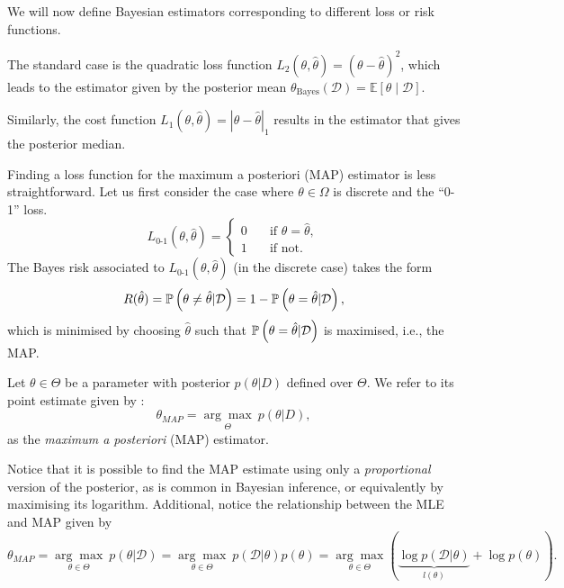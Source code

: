 We will now define Bayesian estimators corresponding to different loss or risk functions.

\begin{definition}
The standard case is the quadratic loss function $L_2(\theta,\hat{\theta}) = (\theta-\hat{\theta})^2$, which leads to the estimator given by the posterior mean $\theta_{\mathrm{Bayes}}(\mathcal{D}) = \mathbb{E}[\theta \mid \mathcal{D}]$.
\end{definition}


\begin{definition}
Similarly, the cost function $L_1(\theta,\hat\theta) = |\theta-\hat\theta|_1$ results in the estimator that gives the posterior median.
\end{definition}

Finding a loss function for the maximum a posteriori (MAP) estimator is less straightforward. Let us first consider the case where $\theta \in \Omega$ is discrete and the ``0-1'' loss.
\[   
L_\text{0-1}(\theta,\hat\theta) = 
     \begin{cases}
       0 &\quad\text{if } \theta = \hat\theta,\\
       1 &\quad\text{if not}. 
     \end{cases}
\]
The Bayes risk associated to $L_\text{0-1}(\theta,\hat\theta)$ (in the discrete case) takes the form
\begin{equation}
    R(\hat\theta) = \mathbb{P} \left(\theta\neq\hat\theta|{\mathcal D}\right) = 1-\mathbb{P} \left(\theta = \hat\theta|{\mathcal D}\right),
\end{equation}
which is minimised by choosing $\hat{\theta}$ such that $\mathbb{P} \left(\theta = \hat\theta|{\mathcal D}\right)$ is maximised, i.e., the MAP. 

\begin{definition}
Let $\theta \in \Theta$ be a parameter with posterior $p(\theta |D)$ defined over $\Theta$. We refer to its point estimate given by : 
$$
\theta_{MAP}= \underset{\Theta}{\arg\max}\ p(\theta|D),
$$
as the \emph{maximum a posteriori} (MAP) estimator. 
\end{definition}

\begin{remark}
Notice that it is possible to find the MAP estimate using only a \emph{proportional} version of the posterior, as is common in Bayesian inference, or equivalently by maximising its logarithm. Additional, notice the relationship between the MLE and MAP given by
$$
\theta_{MAP} = \underset{\theta \in \Theta}{\arg\max }\ p(\theta|\mathcal{D}) = \underset{\theta \in \Theta}{\arg\max }\ p(\mathcal{D}|\theta)p(\theta)= \underset{\theta \in \Theta}{\arg\max}\left(\underbrace{\log p(\mathcal{D}|\theta)}_{l(\theta)} + \log p(\theta)\right).
$$

\end{remark}

